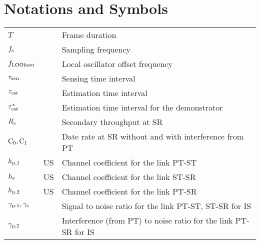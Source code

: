 
\chapter{Notations and Symbols}
\renewcommand{\arraystretch}{1.4}
\begin{longtable}{p{}p{}p{}}

       $T$                     & &             Frame duration \\
       $f_{\text{s}}$                 & &             Sampling frequency \\
       $f_{\text{LOOfsset}}$                  & & 	       Local oscillator offset frequency \\
       $\tau_{\text{sen}}$                 & &             Sensing time interval \\
       $\tau_{\text{est}}$                 & &             Estimation time interval \\      
       ${\tau}^*_{\text{est}}$               & &             Estimation time interval for the demonstrator \\      
       $R_{\text{s}}$                   & &          Secondary throughput at SR \\
       $\text{C}_{\text{0}},\text{C}_{\text{1}}$               & &          Date rate at SR without and with interference from PT  \\
      
       $h_{\text{p,1}}$                  & US &             Channel coefficient for the link PT-ST \\
       $h_{\text{s}}$                   & US &             Channel coefficient for the link ST-SR \\
       $h_{\text{p,2}}$                  & US &             Channel coefficient for the link PT-SR \\
       ${\gamma}_{\text{p,1}}, {\gamma}_{\text{s}}$      & &             Signal to noise ratio for the link PT-ST, ST-SR for IS \\
       ${\gamma}_{\text{p,2}}$                & &             Interference (from PT) to noise ratio for the link PT-SR for IS \\


\end{longtable}
